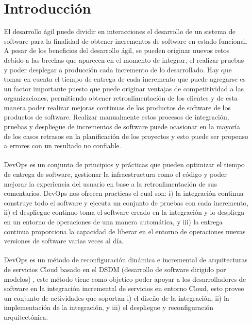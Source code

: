 \documentclass[preprint,12pt]{elsarticle}
\begin{document}



\section{Introducción}

El desarrollo ágil puede dividir en interacciones el desarrollo de un sistema de software para la finalidad de obtener incrementos de software en estado funcional. 
A pesar de los beneficios del desarrollo ágil, se pueden originar nuevos retos debido a las brechas que aparecen en el momento de integrar, el realizar pruebas y poder desplegar a producción cada incremento de lo desarrollado.
Hay que tomar en cuenta el tiempo de entrega de cada incremento que puede agregarse es un factor importante puesto que puede originar ventajas de competitividad 
a las organizaciones, permitiendo obtener retroalimentación de los clientes y de esta manera poder realizar mejoras continuas de los productos de software de los productos de software.
Realizar manualmente estos procesos de integración, pruebas y despliegue de incrementos de software puede ocasionar en la mayoría de los casos retrasos en la planificación de los proyectos
 y esto puede ser propenso a errores con un resultado no confiable.
\\
\\
DevOps es un conjunto de principios y prácticas que pueden optimizar el tiempo de entrega de software, gestionar la infraestructura como el código y poder mejorar la experiencia del usuario en base a la retroalimentación de sus comentarios.
DevOps nos ofrecen practicas el cual son: i) la integración continua construye todo el software y ejecuta un conjunto de pruebas con
cada incremento, ii) el despliegue continuo toma el software creado en la integración
y lo despliega en un entorno de operaciones de una manera automática, y iii) la entrega continua proporciona la capacidad de liberar en el entorno de operaciones nuevas
versiones de software varias veces al día.
\\
\\
DevOps es un método de reconfiguración dinámica e incremental de arquitecturas de servicios Cloud basado en el DSDM 
(desarrollo de software dirigido por modelos) , este método tiene como objetico poder apoyar a los desarrolladores de software 
en la integración incremental de servicios en entorno Cloud, esto provee un conjunto de actividades que soportan i) el diseño de la integración, 
ii) la implementación de la integración, y iii) el despliegue y reconfiguración arquitectónica.
\end{document}
